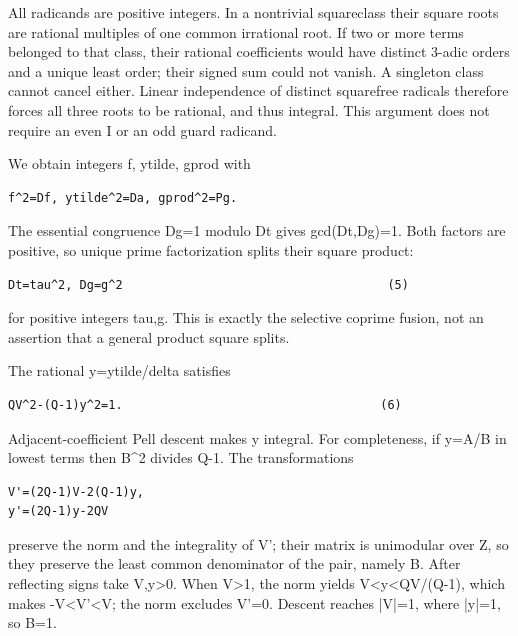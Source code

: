 All radicands are positive integers. In a nontrivial squareclass their square roots are rational multiples of one common irrational root. If two or more terms belonged to that class, their rational coefficients would have distinct 3-adic orders and a unique least order; their signed sum could not vanish. A singleton class cannot cancel either. Linear independence of distinct squarefree radicals therefore forces all three roots to be rational, and thus integral. This argument does not require an even I or an odd guard radicand.



We obtain integers f, ytilde, gprod with



\begin{verbatim}
f^2=Df, ytilde^2=Da, gprod^2=Pg.
\end{verbatim}

The essential congruence Dg=\allowbreak{}1 modulo Dt gives gcd(Dt,Dg)=\allowbreak{}1. Both factors are positive, so unique prime factorization splits their square product:



\begin{verbatim}
Dt=tau^2, Dg=g^2                                     (5)
\end{verbatim}

for positive integers tau,g. This is exactly the selective coprime fusion, not an assertion that a general product square splits.



The rational y=\allowbreak{}ytilde/\allowbreak{}delta satisfies



\begin{verbatim}
QV^2-(Q-1)y^2=1.                                    (6)
\end{verbatim}

Adjacent-coefficient Pell descent makes y integral. For completeness, if y=\allowbreak{}A/\allowbreak{}B in lowest terms then B\textasciicircum{}\allowbreak{}2 divides Q-1. The transformations



\begin{verbatim}
V'=(2Q-1)V-2(Q-1)y,
y'=(2Q-1)y-2QV
\end{verbatim}

preserve the norm and the integrality of V'; their matrix is unimodular over Z, so they preserve the least common denominator of the pair, namely B. After reflecting signs take V,y\textgreater{}\allowbreak{}0. When V\textgreater{}\allowbreak{}1, the norm yields V\textless{}\allowbreak{}y\textless{}\allowbreak{}QV/\allowbreak{}(Q-1), which makes -V\textless{}\allowbreak{}V'\textless{}\allowbreak{}V; the norm excludes V'=\allowbreak{}0. Descent reaches |V|=\allowbreak{}1, where |y|=\allowbreak{}1, so B=\allowbreak{}1.



